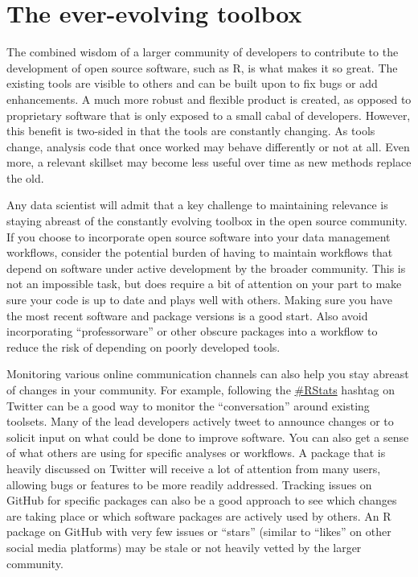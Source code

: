 \documentclass[
]{book}
\begin{document}
\hypertarget{the-ever-evolving-toolbox}{%
\section{The ever-evolving toolbox}\label{the-ever-evolving-toolbox}}

The combined wisdom of a larger community of developers to contribute to the development of open source software, such as R, is what makes it so great. The existing tools are visible to others and can be built upon to fix bugs or add enhancements. A much more robust and flexible product is created, as opposed to proprietary software that is only exposed to a small cabal of developers. However, this benefit is two-sided in that the tools are constantly changing. As tools change, analysis code that once worked may behave differently or not at all. Even more, a relevant skillset may become less useful over time as new methods replace the old.

Any data scientist will admit that a key challenge to maintaining relevance is staying abreast of the constantly evolving toolbox in the open source community. If you choose to incorporate open source software into your data management workflows, consider the potential burden of having to maintain workflows that depend on software under active development by the broader community. This is not an impossible task, but does require a bit of attention on your part to make sure your code is up to date and plays well with others. Making sure you have the most recent software and package versions is a good start. Also avoid incorporating ``professorware'' or other obscure packages into a workflow to reduce the risk of depending on poorly developed tools.

Monitoring various online communication channels can also help you stay abreast of changes in your community. For example, following the \href{https://twitter.com/hashtag/rstats}{\#RStats} hashtag on Twitter can be a good way to monitor the ``conversation'' around existing toolsets. Many of the lead developers actively tweet to announce changes or to solicit input on what could be done to improve software. You can also get a sense of what others are using for specific analyses or workflows. A package that is heavily discussed on Twitter will receive a lot of attention from many users, allowing bugs or features to be more readily addressed. Tracking issues on GitHub for specific packages can also be a good approach to see which changes are taking place or which software packages are actively used by others. An R package on GitHub with very few issues or ``stars'' (similar to ``likes'' on other social media platforms) may be stale or not heavily vetted by the larger community.
\end{document}

